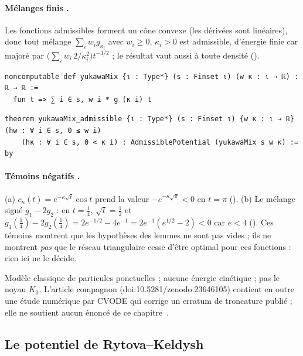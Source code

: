 \paragraph{Mélanges finis \tierA.} Les fonctions admissibles forment un cône convexe (les dérivées sont linéaires),
donc tout mélange $\sum_iw_ig_{\kappa_i}$ avec $w_i\ge0$, $\kappa_i>0$ est admissible, d'énergie finie car majoré par
$\bigl(\sum_iw_i\,2/\kappa_i^2\bigr)t^{-3/2}$ ; le résultat vaut aussi à toute densité ().
\begin{leanbox}
\begin{lstlisting}[style=chdeux]
noncomputable def yukawaMix {ι : Type*} (s : Finset ι) (w κ : ι → ℝ) : ℝ → ℝ :=
  fun t => ∑ i ∈ s, w i * g (κ i) t
\end{lstlisting}
\begin{lstlisting}[style=chdeux]
theorem yukawaMix_admissible {ι : Type*} (s : Finset ι) {w κ : ι → ℝ} (hw : ∀ i ∈ s, 0 ≤ w i)
    (hκ : ∀ i ∈ s, 0 < κ i) : AdmissiblePotential (yukawaMix s w κ) := by
\end{lstlisting}
\end{leanbox}

\paragraph{Témoins négatifs \tierA.} (a) $c_\kappa(t)=e^{-\kappa\sqrt t}\cos t$ prend la valeur
$-e^{-\kappa\sqrt\pi}<0$ en $t=\pi$ (). (b) Le mélange signé $g_1-2g_2$ : en $t=\frac14$,
$\sqrt t=\frac12$ et $g_1(\tfrac14)-2g_2(\tfrac14)=2e^{-1/2}-4e^{-1}=2e^{-1}(e^{1/2}-2)<0$ car $e<4$
(). Ces témoins montrent que les hypothèses des lemmes ne sont pas vides ; ils ne
montrent \emph{pas} que le réseau triangulaire cesse d'être optimal pour ces fonctions : rien ici ne le décide.

\begin{warnbox}[: portée]
Modèle classique de particules ponctuelles ; aucune énergie cinétique ; pas le noyau $K_0$. L'article compagnon
(doi\string:10.5281/zenodo.23646105) contient en outre une étude numérique \tierX{} par CVODE qui corrige un erratum de
troncature publié ; elle ne soutient aucun énoncé de ce chapitre~\cite{ch2yuk}.
\end{warnbox}

\subsection{Le potentiel de Rytova--Keldysh}\label{ch2:ssec:kel}

